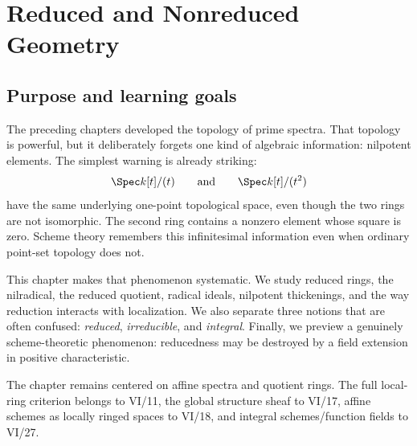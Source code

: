 
\chapter{Reduced and Nonreduced Geometry}
\label{ch:reduced-nonreduced-geometry}
\providecommand{\Nil}{\operatorname{Nil}}

\section*{Purpose and learning goals}

The preceding chapters developed the topology of prime spectra.  That topology is powerful,
but it deliberately forgets one kind of algebraic information: nilpotent elements.  The
simplest warning is already striking:
\[
\Spec k[t]/(t)
\qquad\text{and}\qquad
\Spec k[t]/(t^2)
\]
have the same underlying one-point topological space, even though the two rings are not
isomorphic.  The second ring contains a nonzero element whose square is zero.  Scheme
theory remembers this infinitesimal information even when ordinary point-set topology does
not.

This chapter makes that phenomenon systematic.  We study reduced rings, the nilradical,
the reduced quotient, radical ideals, nilpotent thickenings, and the way reduction interacts
with localization.  We also separate three notions that are often confused:
\emph{reduced}, \emph{irreducible}, and \emph{integral}.  Finally, we preview a genuinely
scheme-theoretic phenomenon: reducedness may be destroyed by a field extension in positive
characteristic.

The chapter remains centered on affine spectra and quotient rings.  The full local-ring
criterion belongs to VI/11, the global structure sheaf to VI/17, affine schemes as locally
ringed spaces to VI/18, and integral schemes/function fields to VI/27.

